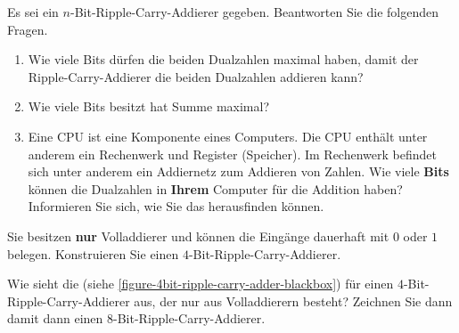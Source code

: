 \newpage

\begin{exercise}
Es sei ein $n$-Bit-Ripple-Carry-Addierer gegeben. Beantworten Sie die folgenden Fragen.
\begin{enumerate}
\item Wie viele Bits dürfen die beiden Dualzahlen maximal haben, damit der Ripple-Carry-Addierer die beiden Dualzahlen addieren kann?

\fillwithgrid	{0.5in}

\item Wie viele Bits besitzt hat Summe maximal?

\fillwithgrid	{0.5in}

\item Eine \ac{CPU} ist eine Komponente eines Computers. Die \ac{CPU} enthält unter anderem ein Rechenwerk und Register (Speicher). Im Rechenwerk befindet sich unter anderem ein Addiernetz zum Addieren von Zahlen. Wie viele \textbf{Bits} können die Dualzahlen in \textbf{Ihrem} Computer für die Addition haben? Informieren Sie sich, wie Sie das herausfinden können.

\fillwithgrid	{0.75in}

\end{enumerate}
\end{exercise}

\begin{exercise}
Sie besitzen \textbf{nur} Volladdierer und können die Eingänge dauerhaft mit $0$ oder $1$ belegen. Konstruieren Sie einen $4$-Bit-Ripple-Carry-Addierer.
\fillwithgrid	{1.5in}
\end{exercise}

\begin{exercise}
Wie sieht die  (siehe \autoref{figure-4bit-ripple-carry-adder-blackbox}) für einen $4$-Bit-Ripple-Carry-Addierer aus, der nur aus Volladdierern besteht? Zeichnen Sie dann damit dann einen $8$-Bit-Ripple-Carry-Addierer.
\end{exercise}